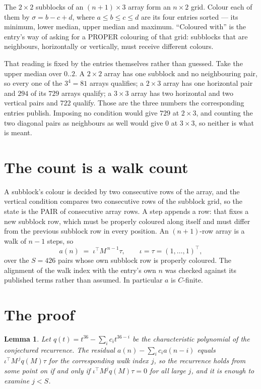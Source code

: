 \documentclass[11pt,a4paper]{article}
\theoremstyle{plain}
\newtheorem{lemma}[theorem]{Lemma}
\theoremstyle{definition}
\begin{document}
The $2\times2$ subblocks of an $(n+1)\times3$ array form an
$n\times2$ grid. Colour each of them by $\sigma=b-c+d$, where $a\le b\le c\le d$ are its four entries sorted --- its minimum, lower median, upper median and maximum. ``Coloured with'' is the entry's way of
asking for a PROPER colouring of that grid: subblocks that are neighbours, horizontally or
vertically, must receive different colours.

That reading is fixed by the entries themselves rather than guessed. Take the upper median
over $0..2$. A $2\times2$ array has one subblock and no neighbouring pair, so every one of the
$3^4=81$ arrays qualifies; a $2\times3$ array has one horizontal pair and $294$ of its $729$
arrays qualify; a $3\times3$ array has two horizontal and two vertical pairs and $722$
qualify. Those are the three numbers the corresponding entries publish. Imposing no condition
would give $729$ at $2\times3$, and counting the two diagonal pairs as neighbours as well
would give $0$ at $3\times3$, so neither is what is meant.

\section{The count is a walk count}

A subblock's colour is decided by two consecutive rows of the array, and
the vertical condition compares two consecutive rows of the subblock grid, so the state is the
PAIR of consecutive array rows. A step appends a row: that fixes a new subblock row, which
must be properly coloured along itself and must differ from the previous subblock row in every
position. An $(n+1)$-row array is a walk of $n-1$ steps, so
\[
a(n)\;=\;\iota^{\!\top}M^{\,n-1}\tau,\qquad\iota=\tau=(1,\dots,1)^{\!\top},
\]
over the $S=426$ pairs whose own subblock row is properly coloured.
The alignment of the walk index with the entry's own $n$ was checked against its published
terms rather than assumed. In particular $a$ is $C$-finite.

\section{The proof}

\begin{lemma}\label{lem:crit}
Let $q(t)=t^{36}-\sum_i c_it^{36-i}$ be the characteristic polynomial of the
conjectured recurrence. The residual $a(n)-\sum_ic_ia(n-i)$ equals
$\iota^{\!\top}M^{\,j}q(M)\tau$ for the corresponding walk index $j$, so the recurrence
holds from some point on if and only if $\iota^{\!\top}M^{j}q(M)\tau=0$ for all large $j$,
and it is enough to examine $j<S$.
\end{lemma}
\end{document}
